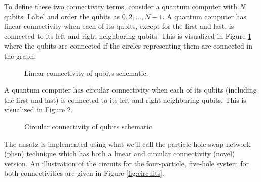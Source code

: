 \documentclass[10pt]{article}
\begin{document}
To define these two connectivity terms, consider a quantum computer with $N$ qubits. Label and order the qubits as $0,2,...,N-1$.
A quantum computer has linear connectivity when each of its qubits, except for the first and last, is connected to its left and right neighboring qubits.
This is visualized in Figure \ref{fig:linear_con} where the qubits are connected if the circles representing them are connected in the graph.
\begin{figure}
\centering
{} 
\caption{Linear connectivity of qubits schematic.}
\label{fig:linear_con}
\end{figure}
A quantum computer has circular connectivity when each of its qubits (including the first and last) is connected to its left and right neighboring qubits. This is visualized in Figure \ref{fig:circular_con}.
\begin{figure}
\centering
{}   
\caption{Circular connectivity of qubits schematic.}
\label{fig:circular_con}
\end{figure}
The ansatz is implemented using what we'll call the particle-hole swap network (phsn) technique which has both a linear \cite{ref:phsn} and circular connectivity (novel) version. An illustration of the circuits for the four-particle, five-hole system for both connectivities are given in Figure \ref{fig:circuits}.
\end{document}
